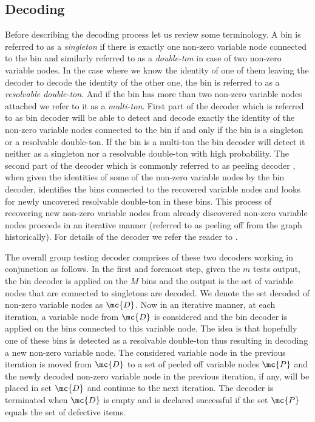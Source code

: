 \documentclass[conference,,twocolumn]{IEEEtran}
\begin{document}
\subsection*{Decoding}
Before describing the decoding process let us review some terminology. A bin is referred to as a \textit{singleton} if there is exactly one non-zero variable node connected to the bin and similarly referred to as a \textit{double-ton} in case of two non-zero variable nodes. In the case where we know the identity of one of them leaving the decoder to decode the identity of the other one, the bin is referred to as a \textit{resolvable double-ton}. And if the bin has more than two non-zero variable nodes attached we refer to it as a \textit{multi-ton}. First part of the decoder which is referred to as bin decoder will be able to detect and decode exactly the identity of the non-zero variable nodes connected to the bin if and only if the bin is a singleton or a resolvable double-ton. If the bin is a multi-ton the bin decoder will detect it neither as a singleton nor a resolvable double-ton with high probability. The second part of the decoder which is commonly referred to as peeling decoder \cite{li2015subisit}, when given the identities of some of the non-zero variable nodes by the bin decoder, identifies the bins connected to the recovered variable nodes and looks for newly uncovered resolvable double-ton in these bins. This process of recovering new non-zero variable nodes from already discovered non-zero variable nodes proceeds in an iterative manner (referred to as peeling off from the graph historically). For details of the decoder we refer the reader to \cite{lee2015saffron}.

The overall group testing decoder comprises of these two decoders working in conjunction as follows. In the first and foremost step, given the $m$ tests output, the bin decoder is applied on the $M$ bins and the output is the set of variable nodes that are connected to singletons are decoded. We denote the set decoded of non-zero variable nodes as $\mc{D}$. Now in an iterative manner, at each iteration, a variable node from $\mc{D}$ is considered and the bin decoder is applied on the bins connected to this variable node.
The idea is that hopefully one of these bins is detected as a resolvable double-ton thus resulting in decoding a new non-zero variable node. The considered variable node in the previous iteration is moved from $\mc{D}$ to a set of peeled off variable nodes $\mc{P}$ and the newly decoded non-zero variable node in the previous iteration, if any, will be placed in set $\mc{D}$ and continue to the next iteration. The decoder is terminated when $\mc{D}$ is empty and is declared successful if the set $\mc{P}$ equals the set of defective items. 
\end{document}
